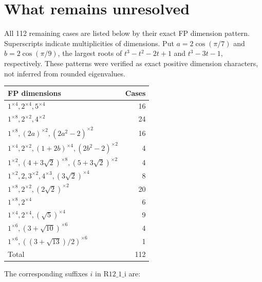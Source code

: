 \documentclass[11pt]{article}
\begin{document}
\section{What remains unresolved}
All 112 remaining cases are listed below by their exact FP dimension pattern.
Superscripts indicate multiplicities of dimensions. Put $a=2\cos(\pi/7)$ and
$b=2\cos(\pi/9)$, the largest roots of $t^3-t^2-2t+1$ and $t^3-3t-1$,
respectively. These patterns were verified as exact positive dimension characters,
not inferred from rounded eigenvalues.
\begin{center}\small\begin{tabular}{p{124mm}r}\toprule FP dimensions & Cases\\\midrule
$1^{\times4},2^{\times4},5^{\times4}$ & 16 \\
$1^{\times8},2^{\times2},4^{\times2}$ & 24 \\
$1^{\times8},(2a)^{\times2},(2a^2-2)^{\times2}$ & 16 \\
$1^{\times4},2^{\times2},(1+2b)^{\times4},(2b^2-2)^{\times2}$ & 4 \\
$1^{\times2},(4+3\sqrt2)^{\times8},(5+3\sqrt2)^{\times2}$ & 4 \\
$1^{\times2},2,3^{\times2},4^{\times3},(3\sqrt2)^{\times4}$ & 8 \\
$1^{\times8},2^{\times2},(2\sqrt2)^{\times2}$ & 20 \\
$1^{\times8},2^{\times4}$ & 6 \\
$1^{\times4},2^{\times4},(\sqrt5)^{\times4}$ & 9 \\
$1^{\times6},(3+\sqrt{10})^{\times6}$ & 4 \\
$1^{\times6},((3+\sqrt{13})/2)^{\times6}$ & 1 \\
\midrule Total&112\\\bottomrule\end{tabular}\end{center}
The corresponding suffixes $i$ in $\mathrm{R12\_1\_i}$ are:
\end{document}
